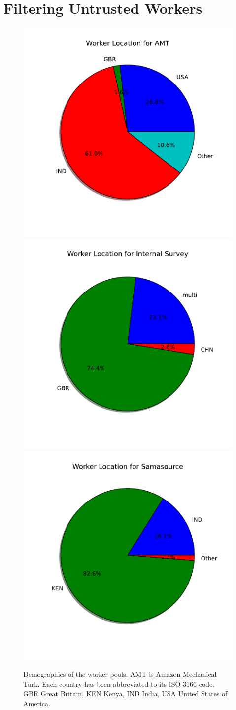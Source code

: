 \section{Filtering Untrusted Workers}
\label{SectionNeedToFilter}


\begin{figure}
\centering
\includegraphics[width = 0.32 \columnwidth]{annotation/demog-amt.pdf}
\includegraphics[width = 0.32 \columnwidth]{annotation/demog-internal.pdf}
\includegraphics[width = 0.32 \columnwidth]{annotation/demog-sama.pdf}
\caption[Demographics of the worker pools.]{Demographics of the worker pools. AMT is Amazon Mechanical Turk. Each country has been abbreviated to its ISO 3166 code. GBR Great Britain, KEN Kenya, IND India, USA United States of America.}
\label{FigureCrowdDemographics}
\end{figure}

